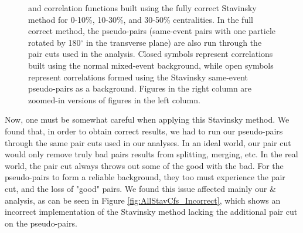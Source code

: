 \documentclass[../AnalysisNoteJBuxton.tex]{subfiles}
\begin{document}
\begin{figure}[h!]
  \caption[\LamK Stavinsky Correlation Functions (Correct)]{\LamK and \ALamAK correlation functions built using the fully correct Stavinsky method for 0-10\%, 10-30\%, and 30-50\% centralities.  In the full correct method, the pseudo-pairs (same-event pairs with one particle rotated by 180$^\circ$ in the transverse plane) are also run through the pair cuts used in the analysis.  Closed symbols represent correlations built using the normal mixed-event background, while open symbols represent correlations formed using the Stavinsky same-event pseudo-pairs as a background.  Figures in the right column are zoomed-in versions of figures in the left column.}
  \label{fig:AllStavCfs_Correct}
\end{figure}




Now, one must be somewhat careful when applying this Stavinsky method.  We found that, in order to obtain correct results, we had to run our pseudo-pairs through the same pair cuts used in our analyses.  In an ideal world, our pair cut would only remove truly bad pairs results from splitting, merging, etc.  In the real world, the pair cut always throws out some of the good with the bad.  For the pseudo-pairs to form a reliable background, they too must experience the pair cut, and the loss of "good" pairs.  We found this issue affected mainly our \LamKchP \& \ALamKchM analysis, as can be seen in Figure \ref{fig:AllStavCfs_Incorrect}, which shows an incorrect implementation of the Stavinsky method lacking the additional pair cut on the pseudo-pairs.
\end{document}
